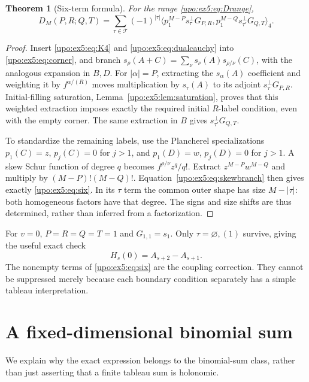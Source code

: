 \documentclass[11pt,letterpaper]{article}
\newtheorem{theorem}{Theorem}[section]
\theoremstyle{remark}\newtheorem{remark}[theorem]{Remark}
\numberwithin{equation}{section}
\newcommand{\ip}[2]{\langle #1,#2\rangle_4}
\newcommand{\Tset}{\mathcal T}
\begin{document}
\begin{theorem}[Six-term formula]\label{upo:ex5:thm:six}
For the range \eqref{upo:ex5:eq:Drange},
\begin{equation}\label{upo:ex5:eq:six}
 D_M(P,R;Q,T)
 =\sum_{\tau\in\Tset}(-1)^{|\tau|}
 \ip{p_1^{M-P}s_\tau^\perp G_{P,R}}
     {p_1^{M-Q}s_{\tau'}^\perp G_{Q,T}}.
\end{equation}
\end{theorem}
\begin{proof}
Insert \eqref{upo:ex5:eq:K4} and \eqref{upo:ex5:eq:dualcauchy} into
\eqref{upo:ex5:eq:corner}, and branch
$s_\rho(A+C)=\sum_\nu s_\nu(A)s_{\rho/\nu}(C)$,
with the analogous expansion in $B,D$.
For $|\alpha|=P$, extracting the $s_\alpha(A)$ coefficient and
weighting it by $f^{\alpha/(R)}$ moves multiplication by
$s_\tau(A)$ to its adjoint $s_\tau^\perp G_{P,R}$.
Initial-filling saturation, Lemma~\ref{upo:ex5:lem:saturation}, proves that
this weighted extraction imposes exactly the required initial
$R$-label condition, even with the empty corner. The same extraction
in $B$ gives $s_{\tau'}^\perp G_{Q,T}$.

To standardize the remaining labels, use the Plancherel
specializations $p_1(C)=z$, $p_j(C)=0$ for $j>1$, and
$p_1(D)=w$, $p_j(D)=0$ for $j>1$. A skew Schur function of degree $q$
becomes $f^{\rho/\nu}z^q/q!$. Extract
$z^{M-P}w^{M-Q}$ and multiply by $(M-P)!(M-Q)!$.
Equation~\eqref{upo:ex5:eq:skewbranch} then gives exactly \eqref{upo:ex5:eq:six}.
In its $\tau$ term the common outer shape has size $M-|\tau|$:
both homogeneous factors have that degree. The signs and size shifts
are thus determined, rather than inferred from a factorization.
\end{proof}

For $v=0$, $P=R=Q=T=1$ and $G_{1,1}=s_1$.
Only $\tau=\varnothing,(1)$ survive, giving the useful exact check
\begin{equation}\label{upo:ex5:eq:H0}
 H_s(0)=A_{s+2}-A_{s+1}.
\end{equation}
The nonempty terms of \eqref{upo:ex5:eq:six} are the coupling correction.
They cannot be suppressed merely because each boundary condition
separately has a simple tableau interpretation.

\section{A fixed-dimensional binomial sum}\label{upo:ex5:sec:diagonal}
We explain why the exact expression belongs to the binomial-sum
class, rather than just asserting that a finite tableau sum is
holonomic.
\end{document}
